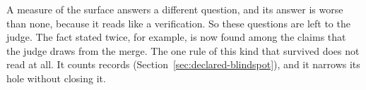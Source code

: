 \noindent A measure of the surface answers a different question, and its answer is worse than none, because it reads like a verification. So these questions are left to the judge. The fact stated twice, for example, is now found among the claims that the judge draws from the merge. The one rule of this kind that survived does not read at all. It counts records (Section~\ref{sec:declared-blindspot}), and it narrows its hole without closing it.
